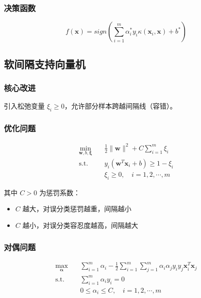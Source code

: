 \documentclass[12pt,a4paper]{ctexart}
\begin{document}
\subsubsection{决策函数}

\[
f(\mathbf{x}) = sign\left(\sum_{i=1}^{m}\alpha_i^* y_i \kappa(\mathbf{x}_i, \mathbf{x}) + b^*\right)
\]

\subsection{软间隔支持向量机}

\subsubsection{核心改进}

引入松弛变量 $\xi_i \geq 0$，允许部分样本跨越间隔线（容错）。

\subsubsection{优化问题}

\begin{align}
\min_{\mathbf{w}, b, \boldsymbol{\xi}} \quad & \frac{1}{2}\|\mathbf{w}\|^2 + C\sum_{i=1}^{m}\xi_i \\
\text{s.t.} \quad & y_i(\mathbf{w}^T\mathbf{x}_i + b) \geq 1 - \xi_i \\
& \xi_i \geq 0, \quad i = 1, 2, \cdots, m
\end{align}

其中 $C > 0$ 为惩罚系数：
\begin{itemize}
    \item $C$ 越大，对误分类惩罚越重，间隔越小
    \item $C$ 越小，对误分类容忍度越高，间隔越大
\end{itemize}

\subsubsection{对偶问题}

\begin{align}
\max_{\boldsymbol{\alpha}} \quad & \sum_{i=1}^{m}\alpha_i - \frac{1}{2}\sum_{i=1}^{m}\sum_{j=1}^{m}\alpha_i\alpha_j y_i y_j \mathbf{x}_i^T\mathbf{x}_j \\
\text{s.t.} \quad & \sum_{i=1}^{m}\alpha_i y_i = 0 \\
& 0 \leq \alpha_i \leq C, \quad i = 1, 2, \cdots, m
\end{align}
\end{document}
